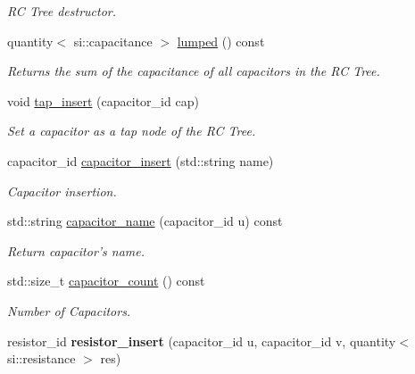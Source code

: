 \begin{DoxyCompactItemize}
\begin{DoxyCompactList}\small\item\em R\-C Tree destructor. \end{DoxyCompactList}\item 
quantity$<$ si\-::capacitance $>$ \hyperlink{classophidian_1_1interconnection_1_1rc__tree_a592637445f8764ca6749d6baf04ca8ba}{lumped} () const 
\begin{DoxyCompactList}\small\item\em Returns the sum of the capacitance of all capacitors in the R\-C Tree. \end{DoxyCompactList}\item 
\hypertarget{classophidian_1_1interconnection_1_1rc__tree_adef2b9bd9b3945bfaa92296aa0914485}{void \hyperlink{classophidian_1_1interconnection_1_1rc__tree_adef2b9bd9b3945bfaa92296aa0914485}{tap\-\_\-insert} (capacitor\-\_\-id cap)}\label{classophidian_1_1interconnection_1_1rc__tree_adef2b9bd9b3945bfaa92296aa0914485}

\begin{DoxyCompactList}\small\item\em Set a capacitor as a tap node of the R\-C Tree. \end{DoxyCompactList}\item 
capacitor\-\_\-id \hyperlink{classophidian_1_1interconnection_1_1rc__tree_a800437d718c8a08ddc406aad005fe305}{capacitor\-\_\-insert} (std\-::string name)
\begin{DoxyCompactList}\small\item\em Capacitor insertion. \end{DoxyCompactList}\item 
std\-::string \hyperlink{classophidian_1_1interconnection_1_1rc__tree_a89db718c78d9ab237e3bcc461b10c350}{capacitor\-\_\-name} (capacitor\-\_\-id u) const 
\begin{DoxyCompactList}\small\item\em Return capacitor's name. \end{DoxyCompactList}\item 
std\-::size\-\_\-t \hyperlink{classophidian_1_1interconnection_1_1rc__tree_a29601551ac7d8d622ef12dd72a373dab}{capacitor\-\_\-count} () const 
\begin{DoxyCompactList}\small\item\em Number of Capacitors. \end{DoxyCompactList}\item 
\hypertarget{classophidian_1_1interconnection_1_1rc__tree_a9d9fa55505a49e5adc7847f485711987}{resistor\-\_\-id {\bfseries resistor\-\_\-insert} (capacitor\-\_\-id u, capacitor\-\_\-id v, quantity$<$ si\-::resistance $>$ res)}\label{classophidian_1_1interconnection_1_1rc__tree_a9d9fa55505a49e5adc7847f485711987}


\end{DoxyCompactItemize}
